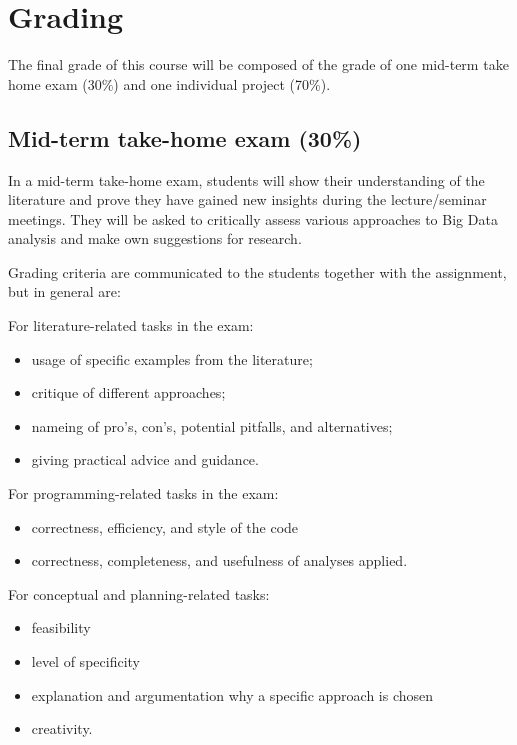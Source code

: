 \documentclass[a4paper,12pt]{report}
\begin{document}
\section*{Grading}

The final grade of this course will be composed of the grade of one mid-term take home exam (30\%) and one individual project (70\%).

\subsection*{Mid-term take-home exam (30\%)}
In a mid-term take-home exam, students will show their understanding of the literature and prove they have gained new insights during the lecture/seminar meetings. They will be asked to critically assess various approaches to Big Data analysis and make own suggestions for research.

Grading criteria are communicated to the students together with the assignment, but in general are:

For literature-related tasks in the exam:
\begin{itemize}
	\item usage of specific examples from the literature;
	\item critique of different approaches;
	\item nameing of pro's, con's, potential pitfalls, and alternatives;
	\item giving practical advice and guidance.
\end{itemize}
For programming-related tasks in the exam:
\begin{itemize}
	\item correctness, efficiency, and style of the code
	\item correctness, completeness, and usefulness of analyses applied.
\end{itemize}

For conceptual and planning-related tasks:
\begin{itemize}
	\item feasibility
	\item level of specificity
	\item explanation and argumentation why a specific approach is chosen
	\item creativity.
\end{itemize}
\end{document}
